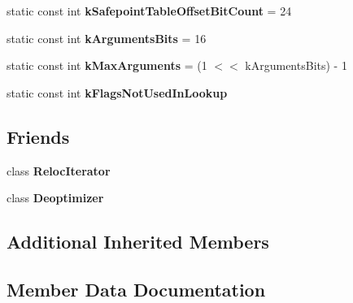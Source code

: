 \begin{DoxyCompactItemize}
\item 
\hypertarget{classv8_1_1internal_1_1_code_abde606dd75a661d8662f0e253721ead5}{}static const int {\bfseries k\+Safepoint\+Table\+Offset\+Bit\+Count} = 24\label{classv8_1_1internal_1_1_code_abde606dd75a661d8662f0e253721ead5}

\item 
\hypertarget{classv8_1_1internal_1_1_code_afc85158e43b6593d59c6438ce9ddf8ab}{}static const int {\bfseries k\+Arguments\+Bits} = 16\label{classv8_1_1internal_1_1_code_afc85158e43b6593d59c6438ce9ddf8ab}

\item 
\hypertarget{classv8_1_1internal_1_1_code_a9115cb13cc6486de35b21a2bb82aee65}{}static const int {\bfseries k\+Max\+Arguments} = (1 $<$$<$ k\+Arguments\+Bits) -\/ 1\label{classv8_1_1internal_1_1_code_a9115cb13cc6486de35b21a2bb82aee65}

\item 
static const int {\bfseries k\+Flags\+Not\+Used\+In\+Lookup}
\end{DoxyCompactItemize}
\subsection*{Friends}
\begin{DoxyCompactItemize}
\item 
\hypertarget{classv8_1_1internal_1_1_code_a9ff673d9f08f4ce3738760e4e66dc88a}{}class {\bfseries Reloc\+Iterator}\label{classv8_1_1internal_1_1_code_a9ff673d9f08f4ce3738760e4e66dc88a}

\item 
\hypertarget{classv8_1_1internal_1_1_code_aa89911581cd6ded032f998021aef9e5c}{}class {\bfseries Deoptimizer}\label{classv8_1_1internal_1_1_code_aa89911581cd6ded032f998021aef9e5c}

\end{DoxyCompactItemize}
\subsection*{Additional Inherited Members}


\subsection{Member Data Documentation}
\hypertarget{classv8_1_1internal_1_1_code_ae96feb908e13cef0ff94020a8b3d2692}{}
